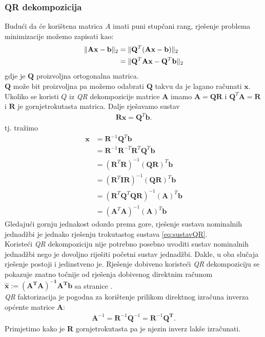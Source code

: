 \documentclass[a4paper,twoside,12pt]{memoir} %
\begin{document}
\subsubsection{QR dekompozicija}
Budući da će korištena matrica $A$ imati puni stupčani rang, rješenje problema minimizacije možemo zapisati kao:
\begin{align}\label{eq:useQR}
\| \mathbf{A}\mathbf{x} - \mathbf{b} \|_2	
& = \| \mathbf{Q}^T(\mathbf{A}\mathbf{x} - \mathbf{b}) \|_2 \\
& = \| \mathbf{Q}^T \mathbf{A}\mathbf{x} - \mathbf{Q}^T \mathbf{b} \|_2	\notag
\end{align}
gdje je $\mathbf{Q}$ proizvoljna ortogonalna matrica.\\
$\mathbf{Q}$ može bit proizvoljna pa možemo odabrati $\mathbf{Q}$ takvu da je lagano računati $\mathbf{x}$.
Ukoliko se koristi $Q$ iz \textit{QR} dekompozicije matrice $\mathbf{A}$ imamo $\mathbf{A} = \mathbf{QR}$ i $\mathbf{Q}^T\mathbf{A} = \mathbf{R}$ i $\mathbf{R}$ je gornjetrokutasta matrica.
Dalje rješavamo sustav
\begin{align}\label{eq:sustavQR}
\mathbf{R}\mathbf{x} = \mathbf{Q}^T\mathbf{b}.
\end{align}
tj. tražimo  
\begin{align*}
\mathbf{x} & = \mathbf{R}^{-1}\mathbf{Q}^T\mathbf{b} \\
& = \mathbf{R}^{-1}\mathbf{R}^{-T}\mathbf{R}^{T}\mathbf{Q}^T\mathbf{b} \\
& = (\mathbf{R}^{T}\mathbf{R})^{-1}(\mathbf{QR})^{T}\mathbf{b} \\
& = (\mathbf{R}^{T} \mathbf{I} \mathbf{R})^{-1}(\mathbf{QR})^{T}\mathbf{b}  \\
& = (\mathbf{R}^{T} \mathbf{Q}^T\mathbf{Q} \mathbf{R})^{-1}(\mathbf{A})^{T}\mathbf{b} \\
& = (\mathbf{A}^{T}\mathbf{A})^{-1}(\mathbf{A})^{T}\mathbf{b}
\end{align*}
Gledajući gornju jednakost odozdo prema gore, rješenje sustava nominalnih jednadžbi je jednako rješenju trokutastog sustava \ref{eq:sustavQR}.\\
Koristeći \textit{QR} dekompoziciju nije potrebno posebno uvoditi sustav nominalnih jednadžbi nego je dovoljno riješiti početni sustav jednadžbi. Dakle, u oba slučaja rješenje postoji i jedinstveno je.
Rješenje dobiveno koristeći \textit{QR} dekompoziciju se pokazuje znatno točnije od rješenja dobivenog
direktnim računom $\mathbf{\hat{x}}:= \mathbf{(A^TA)^{-1}A^T}\mathbf{b}$ sa stranice \pageref{eq:lin1Xeq}.\\
\textit{QR} faktorizacija je pogodna za korištenje prilikom direktnog izračuna 
inverza općente matrice \textbf{A}:
\begin{align}
\mathbf{A}^{-1} = \mathbf{R}^{-1}\mathbf{Q}^{-1} = \mathbf{R}^{-1}\mathbf{Q^T}.
\end{align}
Primjetimo kako je \textbf{R} gornjetrokutasta pa je njezin inverz lakše izračunati.
\end{document}

